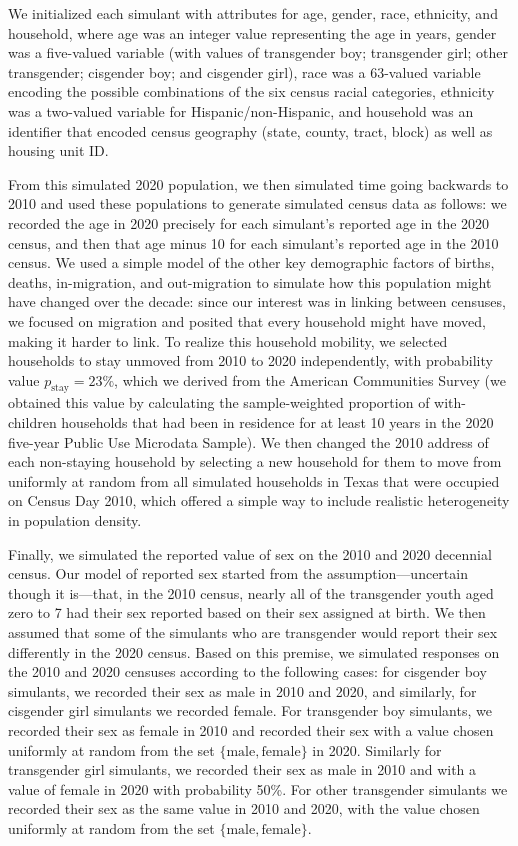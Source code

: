 \documentclass{jpc} %
\theoremstyle{plain}\newtheorem{satz}[thm]{Satz} %
\begin{document}
We initialized each simulant with attributes for age, gender, race, ethnicity, and household, where age was an integer value representing the age in years, gender was a five-valued variable (with values of transgender boy; transgender girl; other transgender; cisgender boy; and cisgender girl), race was a 63-valued variable encoding the possible combinations of the six census racial categories, ethnicity was a two-valued variable for Hispanic/non-Hispanic, and household was an identifier that encoded census geography (state, county, tract, block) as well as housing unit ID.

From this simulated 2020 population, we then simulated time going backwards to 2010 and used these populations to generate simulated census data as follows: we recorded the age in 2020 precisely for each simulant's reported age in the 2020 census, and then that age minus 10 for each simulant's reported age in the 2010 census.  We used a simple model of the other key demographic factors of births, deaths, in-migration, and out-migration to simulate how this population might have changed over the decade: since our interest was in linking between censuses, we focused on migration and posited that every household might have moved, making it harder to link. To realize this household mobility, we selected households to stay unmoved from 2010 to 2020 independently, with probability value $p_{\text{stay}} = 23\%$, which we derived from the American Communities Survey (we obtained this value by calculating the sample-weighted proportion of with-children households that had been in residence for at least 10 years in the 2020 five-year Public Use Microdata Sample).  We then changed the 2010 address of each non-staying household by selecting a new household for them to move from uniformly at random from all simulated households in Texas that were occupied on Census Day 2010, which offered a simple way to include realistic heterogeneity in population density.

Finally, we simulated the reported value of sex on the 2010 and 2020 decennial census. Our model of reported sex started from the assumption---uncertain though it is---that, in the 2010 census, nearly all of the transgender youth aged zero to 7 had their sex reported based on their sex assigned at birth. We then assumed that some of the simulants who are transgender would report their sex differently in the 2020 census.
Based on this premise, we simulated responses on the 2010 and 2020 censuses according to the following cases: for cisgender boy simulants, we recorded their sex as male in 2010 and 2020, and similarly, for cisgender girl simulants we recorded female.  For transgender boy simulants, we recorded their sex as female in 2010 and recorded their sex with a value chosen uniformly at random from the set $\{\text{male}, \text{female}\}$ in 2020.  Similarly for transgender girl simulants, we recorded their sex as male in 2010 and with a value of female in 2020 with probability 50\%.  For other transgender simulants we recorded their sex as the same value in 2010 and 2020, with the value chosen uniformly at random from the set $\{\text{male}, \text{female}\}$.
\end{document}
